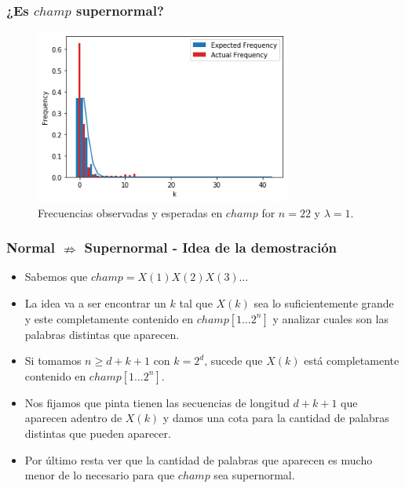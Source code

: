 \documentclass[10pt,mathserif]{beamer}%
\begin{document}
\begin{frame}
  \frametitle{¿Es $champ$ supernormal?}
  \begin{figure}[h]
    \includegraphics[width=0.75\textwidth]{imagenes/champ-22-freq.png}
    \centering
    \caption{Frecuencias observadas y esperadas en $champ$ for $n = 22$ y $\lambda = 1$.}
    \label{fig:champ-22-freq}
\end{figure}
\end{frame}

\begin{frame}
  \frametitle{Normal $\nRightarrow$ Supernormal - Idea de la demostración}
  \begin{itemize}
    \item Sabemos que $champ = X(1)X(2)X(3)\dots$
    \pause 
    \item La idea va a ser encontrar un $k$ tal que $X(k)$ sea lo suficientemente grande y este completamente contenido en $champ[1\dots 2^n]$ y analizar cuales son las palabras distintas que aparecen.
    \pause 
    \item Si tomamos $n \geq d + k + 1$ con $k = 2^d$, sucede que $X(k)$ está completamente contenido en $champ[1\dots 2^n]$.
    \pause 
    \item Nos fijamos que pinta tienen las secuencias de longitud $d + k + 1$ que aparecen adentro de $X(k)$ y damos una cota para la cantidad de palabras distintas que pueden aparecer.
    \pause
    \item Por último resta ver que la cantidad de palabras que aparecen es mucho menor de lo necesario para que $champ$ sea supernormal.
  \end{itemize}
\end{frame}
\end{document}
